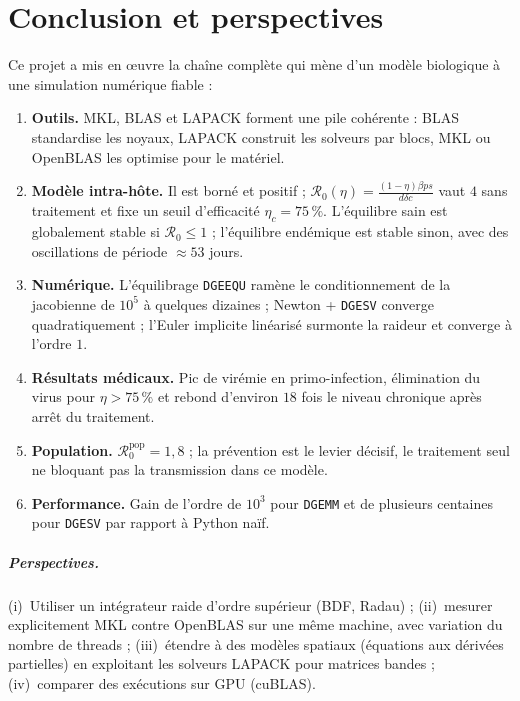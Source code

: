 \documentclass[11pt,a4paper]{report}
\theoremstyle{plain}
\theoremstyle{definition}
\theoremstyle{remark}
\newcommand{\Rzero}{\mathcal{R}_0}
\begin{document}
\chapter*{Conclusion et perspectives}

Ce projet a mis en œuvre la chaîne complète qui mène d'un modèle biologique à une simulation numérique fiable :
\begin{enumerate}
    \item \textbf{Outils.} MKL, BLAS et LAPACK forment une pile cohérente : BLAS standardise les noyaux, LAPACK construit les solveurs par blocs, MKL ou OpenBLAS les optimise pour le matériel.
    \item \textbf{Modèle intra-hôte.} Il est borné et positif ; $\Rzero(\eta)=\frac{(1-\eta)\beta ps}{d\delta c}$ vaut $4$ sans traitement et fixe un seuil d'efficacité $\eta_c=75\,\%$. L'équilibre sain est globalement stable si $\Rzero\le1$ ; l'équilibre endémique est stable sinon, avec des oscillations de période $\approx53$ jours.
    \item \textbf{Numérique.} L'équilibrage \texttt{DGEEQU} ramène le conditionnement de la jacobienne de $10^5$ à quelques dizaines ; Newton + \texttt{DGESV} converge quadratiquement ; l'Euler implicite linéarisé surmonte la raideur et converge à l'ordre $1$.
    \item \textbf{Résultats médicaux.} Pic de virémie en primo-infection, élimination du virus pour $\eta>75\,\%$ et rebond d'environ $18$ fois le niveau chronique après arrêt du traitement.
    \item \textbf{Population.} $\Rzero^{\mathrm{pop}}=1{,}8$ ; la prévention est le levier décisif, le traitement seul ne bloquant pas la transmission dans ce modèle.
    \item \textbf{Performance.} Gain de l'ordre de $10^3$ pour \texttt{DGEMM} et de plusieurs centaines pour \texttt{DGESV} par rapport à Python naïf.
\end{enumerate}

\paragraph{Perspectives.} (i)~Utiliser un intégrateur raide d'ordre supérieur (BDF, Radau) ; (ii)~mesurer explicitement MKL contre OpenBLAS sur une même machine, avec variation du nombre de threads ; (iii)~étendre à des modèles spatiaux (équations aux dérivées partielles) en exploitant les solveurs LAPACK pour matrices bandes ; (iv)~comparer des exécutions sur GPU (cuBLAS).
\end{document}

